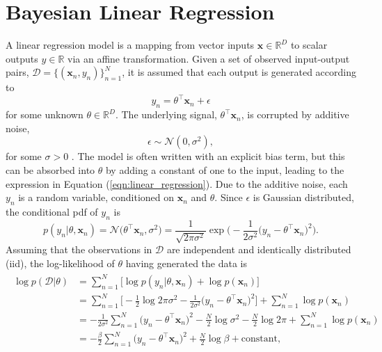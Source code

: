 \documentclass[msc,deptreport.inf]{infthesis} %
\newcommand{\matr}[1]{\mathbf{#1}}
\newcommand{\R}{\mathbb R}
\begin{document}
\section{Bayesian Linear Regression}\label{sec:bayesian_lr}

A linear regression model is a mapping from vector inputs $\matr{x} \in \R^D$ to scalar outputs $y \in \R$ via an affine transformation. Given a set of observed input-output pairs, $\mathcal{D} = \{(\matr{x}_n, y_n)\}_{n=1}^{N}$, it is assumed that each output is generated according to 
\begin{equation}\label{eqn:linear_regression}
	y_n = \theta^\intercal \matr{x}_n + \epsilon
\end{equation}
for some unknown $\theta \in \R^D$. The underlying signal, $\theta^\intercal \matr{x}_n$, is corrupted by additive noise, 
\begin{equation}
	\epsilon \sim \mathcal{N}(0, \sigma^2), 
\end{equation}
for some $\sigma > 0$ \cite{barber2007}. The model is often written with an explicit bias term, but this can be absorbed into $\theta$ by adding a constant of one to the input, leading to the expression in Equation (\ref{eqn:linear_regression}). Due to the additive noise, each $y_n$ is a random variable, conditioned on $\matr{x}_n$ and $\theta$. Since $\epsilon$ is Gaussian distributed, the conditional pdf of $y_n$ is 
\begin{equation}\label{eqn:linear_regression_pdf}
	p(y_n | \theta, \matr{x}_n) 
	= \mathcal{N}\big(\theta^\intercal \matr{x}_n, \sigma^2\big)
	= \frac{1}{\sqrt{2\pi \sigma^2}} \exp\Big(-\frac{1}{2\sigma^2} \big(y_n - \theta^\intercal \matr{x}_n \big)^2\Big).
\end{equation}
Assuming that the observations in $\mathcal{D}$ are independent and identically distributed (iid), the log-likelihood of $\theta$ having generated the data is 
\begin{align}\label{eqn:linear_regression_log_likelihood}
\begin{split}
	\log p(\mathcal{D} | \theta) 
	& = \sum_{n=1}^N \big[ \log p(y_n | \theta, \matr{x}_n)  + \log p(\matr{x}_n) \big] \\
	& = \sum_{n=1}^N \Big[ -\frac{1}{2} \log 2\pi \sigma^2 - \frac{1}{2\sigma^2} \big(y_n - \theta^\intercal \matr{x}_n \big)^2 \Big]
	+ \sum_{n=1}^N \log p(\matr{x}_n) \\
	& = - \frac{1}{2 \sigma^2} \sum_{n=1}^N \big(y_n - \theta^\intercal \matr{x}_n \big)^2 
	- \frac{N}{2} \log \sigma^2
	- \frac{N}{2} \log 2\pi
	+ \sum_{n=1}^N \log p(\matr{x}_n) \\
	& = - \frac{\beta}{2} \sum_{n=1}^N \big(y_n - \theta^\intercal \matr{x}_n \big)^2 
	+ \frac{N}{2} \log \beta
	+ \text{constant},
\end{split}
\end{align}
\end{document}
